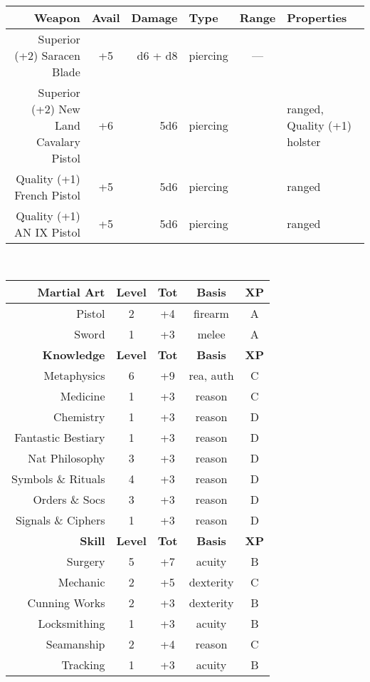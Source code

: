 \documentclass[11pt]{article}
\newcommand{\heading}[1]{{\sc\bfseries #1}}
\begin{document}
%
\\[8pt]
%
\noindent
\begin{tabular}[t]{|r|crl|c|l|}
\hline
\sc\bfseries Weapon
& \sc\bfseries Avail
& \sc\bfseries Damage
& \sc\bfseries Type
& \sc\bfseries Range
& \sc\bfseries Properties
\\ \hline\hline
Superior (+2) Saracen Blade & +5 & d6 + d8 & piercing & --- &
\\ \hline
Superior (+2) New Land Cavalary Pistol & +6 & 5d6 & piercing
& & ranged, Quality (+1) holster
\\
Quality (+1) French Pistol & +5 & 5d6 & piercing &  & ranged
\\
Quality (+1) AN IX Pistol & +5 & 5d6 & piercing &  & ranged
\\ \hline
\end{tabular}
%
\\[12pt]
%
\begin{tabular}[t]{|r|c|c|c|c|}
\hline
%
\heading{Martial Art} & \heading{Level} & \heading{Tot} & \heading{Basis} & \heading{XP}
\\ \hline \hline
\sc Pistol & 2 & +4 & firearm & A
\\
\sc Sword & 1 & +3 & melee & A
\\[12pt] \hline \hline
%
\heading{Knowledge} & \heading{Level} & \heading{Tot} & \heading{Basis} & \heading{XP}
\\ \hline \hline
\sc Metaphysics & 6 & +9 & rea, auth & C
\\
\sc Medicine & 1 & +3 & reason & C
\\
\sc Chemistry & 1 & +3 & reason & D
\\
\sc Fantastic Bestiary & 1 & +3 & reason & D
\\
\sc Nat Philosophy & 3 & +3 & reason & D
\\
\sc Symbols \& Rituals & 4 & +3 & reason & D
\\
\sc Orders \& Socs & 3 & +3 & reason & D
\\
\sc Signals \& Ciphers & 1 & +3 & reason & D
\\[12pt] \hline \hline
%
\heading{Skill} & \heading{Level} & \heading{Tot} & \heading{Basis} & \heading{XP}
\\ \hline \hline
\sc Surgery & 5 & +7 & acuity & B
\\
\sc Mechanic & 2 & +5 & dexterity & C
\\
\sc Cunning Works & 2 & +3 & dexterity & B
\\
\sc Locksmithing & 1 & +3 & acuity & B
\\
\sc Seamanship & 2 & +4 & reason & C
\\
\sc Tracking & 1 & +3 & acuity & B
\\ \hline
\end{tabular}
\end{document}
